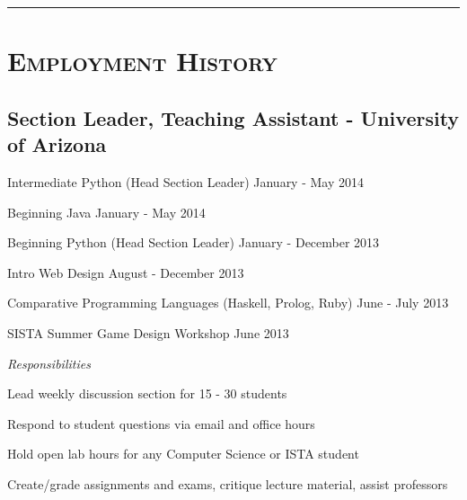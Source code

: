 \documentclass[11pt,letterpaper]{article}
\newcommand{\Hsep}{\color[rgb]{0.6, 0.6, 0.6} \vspace{4mm} \hrule \vspace{-2mm} \color{black}}
\begin{document}
\begin{minipage}{\textwidth}
\Hsep

\section{\scshape Employment History}

\vspace{-2mm}
\subsection{Section Leader, Teaching Assistant - {\small University of Arizona}}
\vspace{-1mm}
\begin{adjustwidth}{2em}{0pt}

Intermediate Python {\small (Head Section Leader)} \hfill January - May 2014

Beginning Java \hfill January - May 2014

Beginning Python {\small (Head Section Leader)} \hfill January - December 2013

Intro Web Design \hfill August - December 2013

Comparative Programming Languages {\small (Haskell, Prolog, Ruby)} \hfill June - July 2013

SISTA Summer Game Design Workshop \hfill June 2013

\vspace{3mm}
{\large \emph {Responsibilities}}

\hspace{2em}Lead weekly discussion section for 15 - 30 students

\hspace{2em}Respond to student questions via email and office hours

\hspace{2em}Hold open lab hours for any Computer Science or ISTA student

\hspace{2em}Create/grade assignments and exams, critique lecture material, assist professors
\end{adjustwidth}

\end{minipage}
\end{document}
